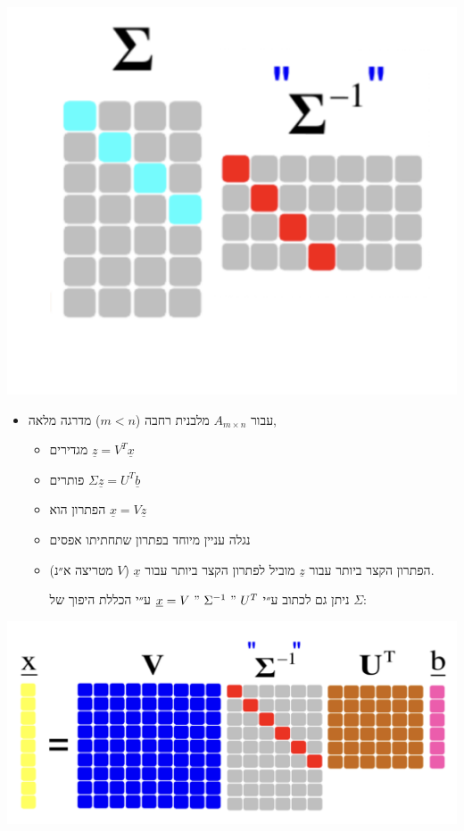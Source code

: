 \documentclass[11pt]{article}
\begin{document}
\begin{center}
\includegraphics[width=.9\linewidth]{./img/generalized-sigma.png}
\end{center}

\begin{itemize}
\item עבור \(A_{m \times n}\) מלבנית רחבה (\(m < n\)) מדרגה מלאה,
\begin{itemize}
\item מגדירים \(\underline{z}=V^T\underline{x}\)
\item פותרים \(\Sigma \underline{z}=U^T\underline{b}\)
\item הפתרון הוא \(\underline{x}=V\underline{z}\)

\item נגלה עניין מיוחד בפתרון שתחתיתו אפסים
\item הפתרון הקצר ביותר עבור \(\underline{z}\) מוביל לפתרון הקצר ביותר עבור \(\underline{x}\) (\(V\) מטריצה א״נ).

ניתן גם לכתוב ע״י  \(\underline{x}=V\ "\ \Sigma^{-1}\ "\ U^T\) ע״י הכללת היפוך של \(\Sigma\):
\end{itemize}
\end{itemize}
\begin{center}
\includegraphics[width=.9\linewidth]{./img/wide-matrix-svd-sys.png}
\end{center}
\end{document}
